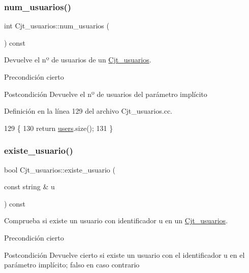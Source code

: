 \subsubsection{\texorpdfstring{num\+\_\+usuarios()}{num\_usuarios()}}
{\footnotesize\ttfamily int Cjt\+\_\+usuarios\+::num\+\_\+usuarios (\begin{DoxyParamCaption}{ }\end{DoxyParamCaption}) const}



Devuelve el nº de usuarios de un \mbox{\hyperlink{class_cjt__usuarios}{Cjt\+\_\+usuarios}}. 

\begin{DoxyPrecond}{Precondición}
cierto 
\end{DoxyPrecond}
\begin{DoxyPostcond}{Postcondición}
Devuelve el nº de usuarios del parámetro implícito 
\end{DoxyPostcond}


Definición en la línea 129 del archivo Cjt\+\_\+usuarios.\+cc.


\begin{DoxyCode}
129                                            \{
130         \textcolor{keywordflow}{return} \mbox{\hyperlink{class_cjt__usuarios_a0b702ca0184d6fb2674cc827d39d5bff}{users}}.size();
131       \}
\end{DoxyCode}
\mbox{\label{class_cjt__usuarios_a97fcd561ffe0aa16a9e59e56bc4ff41c}} 
\subsubsection{\texorpdfstring{existe\+\_\+usuario()}{existe\_usuario()}}
{\footnotesize\ttfamily bool Cjt\+\_\+usuarios\+::existe\+\_\+usuario (\begin{DoxyParamCaption}\item[{const string \&}]{u }\end{DoxyParamCaption}) const}



Comprueba si existe un usuario con identificador u en un \mbox{\hyperlink{class_cjt__usuarios}{Cjt\+\_\+usuarios}}. 

\begin{DoxyPrecond}{Precondición}
cierto 
\end{DoxyPrecond}
\begin{DoxyPostcond}{Postcondición}
Devuelve cierto si existe un usuario con el identificador u en el parámetro implícito; falso en caso contrario 
\end{DoxyPostcond}


